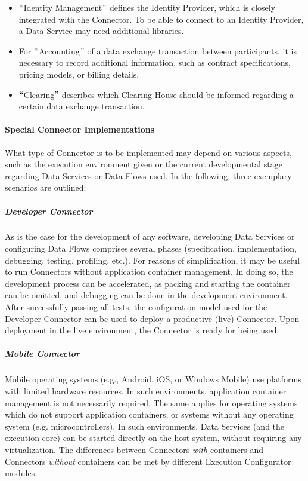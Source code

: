 \begin{itemize}
\begin{itemize}
		\begin{itemize}
			\item $``$Identity Management$"$  defines the Identity Provider, which is closely integrated with the Connector. To be able to connect to an Identity Provider, a Data Service may need additional libraries.

			\item For $``$Accounting$"$  of a data exchange transaction between participants, it is necessary to record additional information, such as contract specifications, pricing models, or billing details.

			\item $``$Clearing$"$  describes which Clearing House should be informed regarding a certain data exchange transaction.
		\end{itemize}
	\end{itemize}
\end{itemize}


\paragraph{Special Connector Implementations\\}
What type of Connector is to be implemented may depend on various aspects, such as the execution environment given or the current developmental stage regarding Data Services or Data Flows used. In the following, three exemplary scenarios are outlined:

\subparagraph*{Developer Connector}
As is the case for the development of any software, developing Data Services or configuring Data Flows comprises several phases (specification, implementation, debugging, testing, profiling, etc.). For reasons of simplification, it may be useful to run Connectors without application container management. In doing so, the development process can be accelerated, as packing and starting the container can be omitted, and debugging can be done in the development environment. After successfully passing all tests, the configuration model used for the Developer Connector can be used to deploy a productive (live) Connector. Upon deployment in the live environment, the Connector is ready for being used.

\subparagraph*{Mobile Connector}
Mobile operating systems (e.g., Android, iOS, or Windows Mobile) use platforms with limited hardware resources. In such environments, application container management is not necessarily required. The same applies for operating systems which do not support application containers, or systems without any operating system (e.g. microcontrollers). In such environments, Data Services (and the execution core) can be started directly on the host system, without requiring any virtualization. The differences between Connectors \textit{with} containers and Connectors \textit{without} containers can be met by different Execution Configurator modules.

